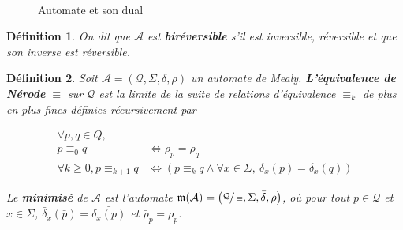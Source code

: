 \documentclass[11pt,a4paper]{article}
\newtheorem{definition}{Définition}
\begin{document}
\begin{figure}[h!]
  \begin{subfigure}[b]{0.5\textwidth}
    \centering
  \end{subfigure}
  ~
  \begin{subfigure}[b]{0.5\textwidth}
    \centering
  \end{subfigure}
  \caption{Automate et son dual}
\end{figure}


\begin{definition}
  On dit que $\mathcal{A}$ est \textbf{biréversible} s'il est inversible, réversible et que son inverse est réversible.
\end{definition}

\begin{definition}
  Soit $\mathcal{A}=\left(\mathcal{Q}, \Sigma, \delta, \rho\right)$ un automate de Mealy. \textbf{L'équivalence de Nérode} $\equiv$ sur $\mathcal{Q}$ est la limite de la suite de relations d'équivalence $\equiv_k$ de plus en plus fines définies récursivement par

  \begin{align*}
    \forall p, q \in Q,\\
    p \equiv_0 q &\iff \rho_p = \rho_q \\
    \forall k \geq 0, p \equiv_{k+1}q &\iff \left(p\equiv_kq \wedge \forall x \in \Sigma,~\delta_x(p)=\delta_x(q)\right)
  \end{align*}

  Le \textbf{minimisé} de $\mathcal{A}$ est l'automate $\mathfrak{m}(\mathcal{A})=\left(\sfrac{\mathcal{Q}}{\equiv}, \Sigma, \bar{\delta}, \bar{\rho}\right)$, où pour tout $p\in\mathcal{Q}$ et $x\in\Sigma$, $\bar{\delta}_x(\bar{p}) = \bar{\delta_x(p)}$ et $\bar{\rho}_{\bar{p}} =  \rho_p$.
\end{definition}
\end{document}
